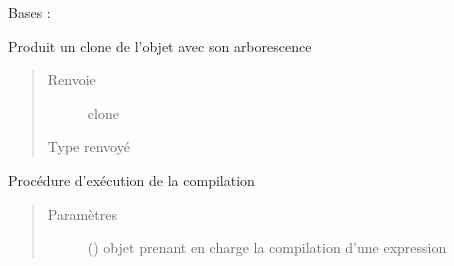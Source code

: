 \documentclass[letterpaper,10pt,french]{sphinxmanual}
\begin{document}
\begin{fulllineitems}
\label{\detokenize{arithmeticexpressionnodes:arithmeticexpressionnodes.BinaryArithmeticNode}}
Bases : {\hyperref[\detokenize{arithmeticexpressionnodes:arithmeticexpressionnodes.ArithmeticExpressionNode}]{}}

\begin{fulllineitems}
\label{\detokenize{arithmeticexpressionnodes:arithmeticexpressionnodes.BinaryArithmeticNode.clone}}
Produit un clone de l’objet avec son arborescence
\begin{quote}\begin{description}
\item[{Renvoie}] \leavevmode
clone

\item[{Type renvoyé}] \leavevmode
{\hyperref[\detokenize{arithmeticexpressionnodes:arithmeticexpressionnodes.BinaryArithmeticNode}]{}}

\end{description}\end{quote}

\end{fulllineitems}


\begin{fulllineitems}
\label{\detokenize{arithmeticexpressionnodes:arithmeticexpressionnodes.BinaryArithmeticNode.compile}}
Procédure d’exécution de la compilation
\begin{quote}\begin{description}
\item[{Paramètres}] \leavevmode
{} ({\hyperref[\detokenize{compileexpressionmanager:compileexpressionmanager.CompileExpressionManager}]{}}) \textendash{} objet prenant en charge la compilation d’une expression


\end{description}
\end{quote}
\end{fulllineitems}
\end{fulllineitems}
\end{document}

